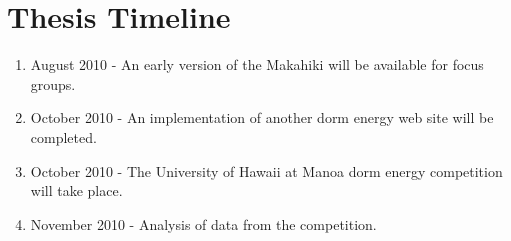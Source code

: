 \section{Thesis Timeline}
\label{timeline}

\begin{enumerate}
\item August 2010 - An early version of the Makahiki will be available for focus groups.
\item October 2010 - An implementation of another dorm energy web site will be completed.
\item October 2010 - The University of Hawaii at Manoa dorm energy competition will take place.
\item November 2010 - Analysis of data from the competition.
\end{enumerate}